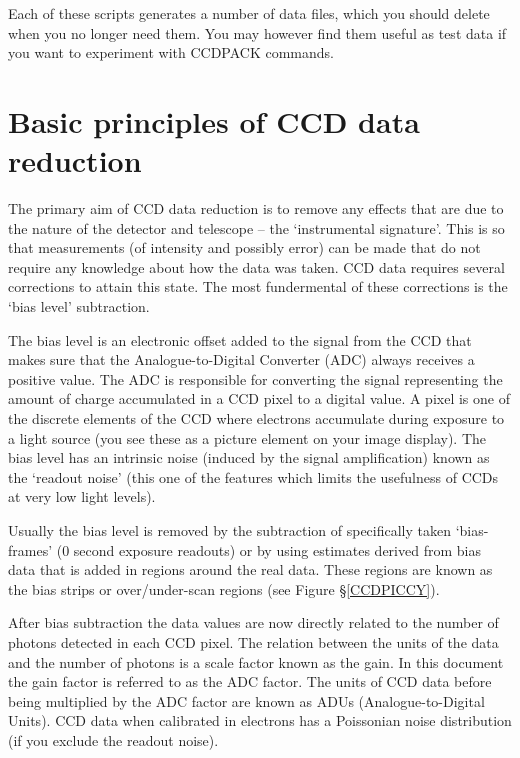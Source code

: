 \documentclass[twoside,11pt]{article}
\newcommand{\hyperref}[4]{#2\ref{#4}#3}
\newcommand{\xlabel}[1]{}
\renewcommand{\_}{\texttt{\symbol{95}}}
\begin{document}
Each of these scripts generates a number of data files, which 
you should delete when you no longer need them.  You may
however find them useful as test data if you want to experiment
with CCDPACK commands.


\section{Basic principles of CCD data reduction\xlabel{CCDprinciples}}

The primary aim of CCD data reduction is to remove any effects that are
due to the nature of the detector and telescope -- the `instrumental
signature'.
This is so that measurements (of intensity and possibly error) can be
made that do not require any knowledge about how the data was taken.
CCD data requires several corrections to attain this state.
The most fundermental of these corrections is the `bias level' subtraction.

The bias level is an electronic offset added to the signal from the
CCD that makes sure that the Analogue-to-Digital Converter (ADC)
always receives a positive value.
The ADC is responsible for converting the signal representing
the amount of charge accumulated in a CCD pixel to a digital value.
A pixel is one of the discrete elements of the CCD where electrons
accumulate during exposure to a light source (you see these as a
picture element on your image display).
The bias level has an intrinsic noise (induced by the signal
amplification) known as the `readout noise' (this one of the features
which limits the usefulness of CCDs at very low light levels).

Usually the bias level is removed by the subtraction of specifically
taken `bias-frames' ($0$ second exposure readouts) or by using
estimates derived from bias data that is added in regions around
the real data. These regions are known as the bias strips or
over/under-scan regions (see \hyperref{this figure}{Figure
\S}{}{CCDPICCY}).

After bias subtraction the data values are now directly related to the
number of photons detected in each CCD pixel.
The relation between the units of the data and the number of photons
is a scale factor known as the gain.
In this document the gain factor is referred to as the ADC factor.
The units of CCD data before being multiplied by the ADC factor are
known as ADUs (Analogue-to-Digital Units).
CCD data when calibrated in electrons has a Poissonian noise distribution
(if you exclude the readout noise).
\end{document}
